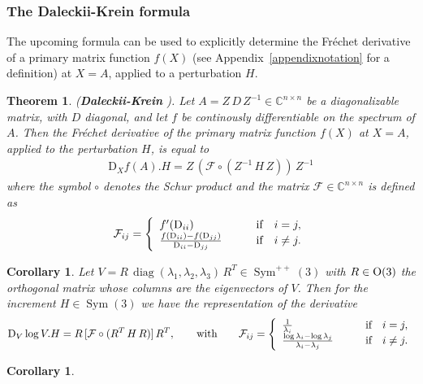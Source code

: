 \documentclass[10pt]{article}
\newcounter{theoremCounter}
\numberwithin{theoremCounter}{section}
\theoremstyle{plain}
\newtheorem{thm}[theoremCounter]{Theorem}
\newtheorem{cor}[theoremCounter]{Corollary}
\theoremstyle{definition}
\newcommand{\OO}{{\rm O}}
\newcommand{\DD}{\mathrm{D}}
\DeclareMathOperator{\diag}{diag}
\DeclareMathOperator{\Sym}{Sym}
\def\C{\mathbb{C}}
\numberwithin{equation}{section}
\begin{document}
\begin{appendix}
\subsubsection{The Daleckii-Krein formula}
%
The upcoming formula can be used to explicitly determine the Fréchet derivative of a primary matrix function $f(X)$ (see Appendix~\ref{appendixnotation} for a definition) at $X = A$, applied to a perturbation $H$.
%
	\begin{thm} \label{Daleckii-KreinThm} \label{thmD-K}
	(\textbf{Daleckii-Krein} \cite{daleckii1965}). Let $A = Z \, D \, Z^{-1} \in \C^{n \times n}$ be a diagonalizable matrix, with $D$ diagonal, and let $f$ be continously differentiable on the spectrum of $A$. Then the Fréchet derivative of the primary matrix function $f(X)$ at $X = A$, applied to the perturbation $H$, is equal to
		\begin{align}
		\DD_X f(A) . H = Z \, (\mathcal{F} \circ (Z^{-1} \, H \, Z)) \, Z^{-1}
		\end{align}
	where the symbol $\circ$ denotes the Schur product and the matrix $\mathcal{F} \in \C^{n \times n}$ is defined as
		\begin{align}
		\mathcal{F}_{ij} = \left\{
			\begin{array}{ll}
			f'(\DD_{ii}) &\qquad \textnormal{if} \quad i = j, \\
			\frac{f(\DD_{ii}) - f(\DD_{jj})}{\DD_{ii} - \DD_{jj}} &\qquad \textnormal{if} \quad i \neq j.
			\end{array}
		\right.
		\end{align}
	\end{thm}
%
	\begin{cor}
	Let $V = R \, \diag(\lambda_1, \lambda_2, \lambda_3) \, R^T \in \Sym^{++}(3)$ with $R \in \OO(3)$ the orthogonal matrix whose columns are the eigenvectors of $V$. Then for the increment $H \in \Sym(3)$ we have the representation of the derivative
		\begin{align}
		\DD_V \log V . H = R \, [\mathcal{F} \circ (R^T \, H \, R)] \, R^T, \qquad \textnormal{with} \qquad \mathcal{F}_{ij} = \left\{
			\begin{array}{ll}
			\frac{1}{\lambda_i} &\qquad \textnormal{if} \quad i = j, \\
			\frac{\log \lambda_i - \log \lambda_j}{\lambda_i - \lambda_j} &\qquad \textnormal{if} \quad i \neq j.
			\end{array}
		\right.
		\end{align}
	\end{cor}
%
	\begin{cor} \label{appendixcor09}

\end{cor}
\end{appendix}
\end{document}
